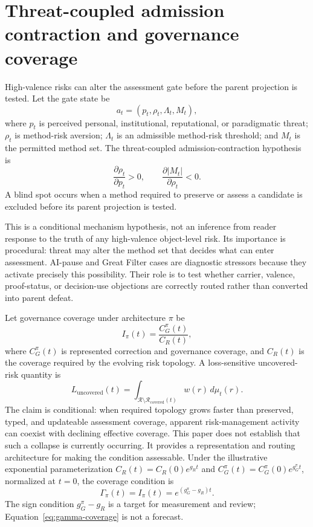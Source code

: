 \documentclass[11pt]{article}
\newcommand{\Risk}{\mathcal{R}}
\begin{document}
\section{Threat-coupled admission contraction and governance coverage}
\label{sec:threat-coverage}

High-valence risks can alter the assessment gate before the parent projection is tested. Let the gate state be
\begin{equation}
a_t=(p_t,\rho_t,\Lambda_t,M_t),
\end{equation}
where $p_t$ is perceived personal, institutional, reputational, or paradigmatic threat; $\rho_t$ is method-risk aversion; $\Lambda_t$ is an admissible method-risk threshold; and $M_t$ is the permitted method set. The threat-coupled admission-contraction hypothesis is
\begin{equation}
\frac{\partial \rho_t}{\partial p_t}>0,\qquad \frac{\partial |M_t|}{\partial \rho_t}<0.
\label{eq:contraction}
\end{equation}
A blind spot occurs when a method required to preserve or assess a candidate is excluded before its parent projection is tested.

This is a conditional mechanism hypothesis, not an inference from reader response to the truth of any high-valence object-level risk. Its importance is procedural: threat may alter the method set that decides what can enter assessment. AI-pause and Great Filter cases are diagnostic stressors because they activate precisely this possibility. Their role is to test whether carrier, valence, proof-status, or decision-use objections are correctly routed rather than converted into parent defeat.

Let governance coverage under architecture $\pi$ be
\begin{equation}
I_\pi(t)=\frac{C_G^\pi(t)}{C_R(t)},
\label{eq:coverage}
\end{equation}
where $C_G^\pi(t)$ is represented correction and governance coverage, and $C_R(t)$ is the coverage required by the evolving risk topology. A loss-sensitive uncovered-risk quantity is
\begin{equation}
L_{\mathrm{uncovered}}(t)=\int_{\Risk\setminus\Risk_{\mathrm{covered}}(t)}w(r)\,d\mu_t(r).
\label{eq:uncovered}
\end{equation}
The claim is conditional: when required topology grows faster than preserved, typed, and updateable assessment coverage, apparent risk-management activity can coexist with declining effective coverage. This paper does not establish that such a collapse is currently occurring. It provides a representation and routing architecture for making the condition assessable. Under the illustrative exponential parameterization $C_R(t)=C_R(0)e^{g_Rt}$ and $C_G^\pi(t)=C_G^\pi(0)e^{g_G^\pi t}$, normalized at $t=0$, the coverage condition is
\begin{equation}
\Gamma_\pi(t)=I_\pi(t)=e^{(g_G^\pi-g_R)t}.
\label{eq:gamma-coverage}
\end{equation}
The sign condition $g_G^\pi-g_R$ is a target for measurement and review; Equation~\eqref{eq:gamma-coverage} is not a forecast.
\end{document}
